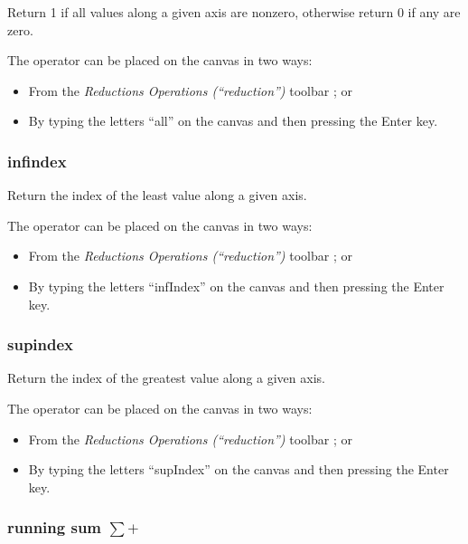 
\label{Operation:all} Return 1 if all values along a given axis are
nonzero, otherwise return 0 if any are zero.

The operator can be placed on the canvas in two ways:
\begin{itemize}
\item From the \emph{Reductions Operations (``reduction'')} toolbar ;
or 
\item By typing the letters ``all'' on the canvas and then pressing the
Enter key.
\end{itemize}

\subsubsection{infindex}

\label{Operation:infIndex} Return the index of the least value along
a given axis.


The operator can be placed on the canvas in two ways:
\begin{itemize}
\item From the \emph{Reductions Operations (``reduction'')} toolbar ;
or 
\item By typing the letters ``infIndex'' on the canvas and then pressing
the Enter key.
\end{itemize}

\subsubsection{supindex}

\label{Operation:supIndex} Return the index of the greatest value
along a given axis.


The operator can be placed on the canvas in two ways:
\begin{itemize}
\item From the \emph{Reductions Operations (``reduction'')} toolbar ;
or 
\item By typing the letters ``supIndex'' on the canvas and then pressing
the Enter key.
\end{itemize}

\subsubsection{running sum $\sum+$}

